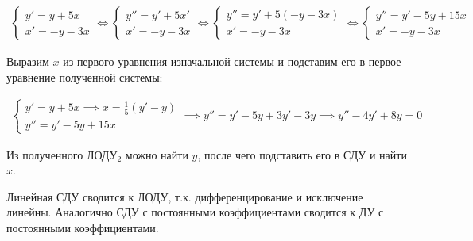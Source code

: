 \begin{align*}
  \begin{cases}
    y' = y + 5x \\
    x' = -y - 3x
  \end{cases} \iff
  \begin{cases}
    y'' = y' + 5x' \\
    x' = -y - 3x
  \end{cases} \iff
  \begin{cases}
    y'' = y' + 5 (-y - 3x) \\
    x' = -y - 3x
  \end{cases} \iff
  \begin{cases}
    y'' = y' - 5y + 15x \\
    x' = -y - 3x
  \end{cases}
\end{align*}

Выразим \(x\) из первого уравнения изначальной системы и подставим его в первое
уравнение полученной системы:

\begin{align*}
  \begin{cases}
    y' = y + 5x \implies x = \frac{1}{5} (y' - y) \\
    y'' = y' - 5y + 15x 
  \end{cases}
  \implies y'' = y' - 5y + 3y' - 3y 
  \implies y'' - 4y' + 8y = 0
\end{align*}

Из полученного ЛОДУ\(_2\) можно найти \(y\), после чего подставить его в СДУ и
найти \(x\).

\begin{remark}
  Линейная СДУ сводится к ЛОДУ, т.к. дифференцирование и исключение линейны.
  Аналогично СДУ с постоянными коэффициентами сводится к ДУ с постоянными
  коэффициентами.
\end{remark}
